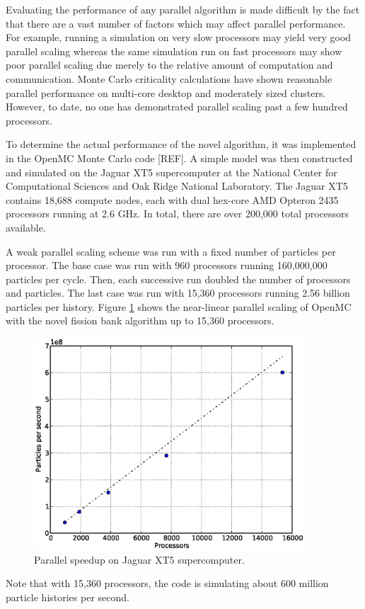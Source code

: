 Evaluating the performance of any parallel algorithm is made difficult by the
fact that there are a vast number of factors which may affect parallel
performance. For example, running a simulation on very slow processors may yield
very good parallel scaling whereas the same simulation run on fast processors
may show poor parallel scaling due merely to the relative amount of computation
and communication. Monte Carlo criticality calculations have shown reasonable
parallel performance on multi-core desktop and moderately sized
clusters. However, to date, no one has demonstrated parallel scaling past a few
hundred processors.

To determine the actual performance of the novel algorithm, it was implemented
in the OpenMC Monte Carlo code [REF]. A simple model was then constructed and
simulated on the Jaguar XT5 supercomputer at the National Center for
Computational Sciences and Oak Ridge National Laboratory. The Jaguar XT5
contains 18,688 compute nodes, each with dual hex-core AMD Opteron 2435
processors running at 2.6 GHz. In total, there are over 200,000 total processors
available.

A weak parallel scaling scheme was run with a fixed number of particles per
processor. The base case was run with 960 processors running 160,000,000
particles per cycle. Then, each successive run doubled the number of processors
and particles. The last case was run with 15,360 processors running 2.56 billion
particles per history. Figure \ref{fig:jaguar-scaling} shows the near-linear
parallel scaling of OpenMC with the novel fission bank algorithm up to 15,360
processors.
\begin{figure}[h!]
  \centering
  \includegraphics[width=0.9\textwidth]{figures/jaguar_results/jaguar.eps}
  \caption{Parallel speedup on Jaguar XT5 supercomputer.}
  \label{fig:jaguar-scaling}
\end{figure}
Note that with 15,360 processors, the code is simulating about 600 million
particle histories per second.

